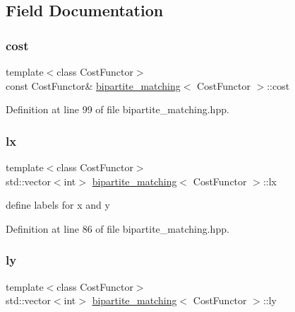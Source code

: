 \subsection{Field Documentation}
\mbox{\label{classbipartite__matching_adf0b76c9da7de5aa08ac2b135832313b}} 
\subsubsection{\texorpdfstring{cost}{cost}}
{\footnotesize\ttfamily template$<$class Cost\+Functor$>$ \\
const Cost\+Functor\& \hyperlink{classbipartite__matching}{bipartite\+\_\+matching}$<$ Cost\+Functor $>$\+::cost\hspace{0.3cm}{\ttfamily [private]}}



Definition at line 99 of file bipartite\+\_\+matching.\+hpp.

\mbox{\label{classbipartite__matching_a442a22f9e3a781eeebf007134b3ff263}} 
\subsubsection{\texorpdfstring{lx}{lx}}
{\footnotesize\ttfamily template$<$class Cost\+Functor$>$ \\
std\+::vector$<$int$>$ \hyperlink{classbipartite__matching}{bipartite\+\_\+matching}$<$ Cost\+Functor $>$\+::lx\hspace{0.3cm}{\ttfamily [private]}}



define labels for x and y 



Definition at line 86 of file bipartite\+\_\+matching.\+hpp.

\mbox{\label{classbipartite__matching_ac43efd1419237aa91e1f1c34b2d02508}} 
\subsubsection{\texorpdfstring{ly}{ly}}
{\footnotesize\ttfamily template$<$class Cost\+Functor$>$ \\
std\+::vector$<$int$>$ \hyperlink{classbipartite__matching}{bipartite\+\_\+matching}$<$ Cost\+Functor $>$\+::ly\hspace{0.3cm}{\ttfamily [private]}}



